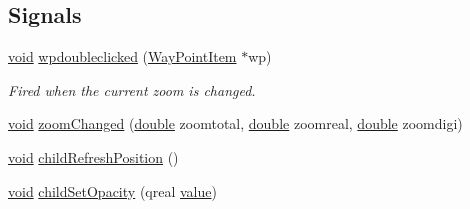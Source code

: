 \subsection*{Signals}
\begin{DoxyCompactItemize}
\item 
\hyperlink{group___u_a_v_objects_plugin_ga444cf2ff3f0ecbe028adce838d373f5c}{void} \hyperlink{group___o_p_map_widget_ga795f053b52b5fe955eee059db5cb0afd}{wpdoubleclicked} (\hyperlink{classmapcontrol_1_1_way_point_item}{Way\-Point\-Item} $\ast$wp)
\begin{DoxyCompactList}\small\item\em Fired when the current zoom is changed. \end{DoxyCompactList}\item 
\hyperlink{group___u_a_v_objects_plugin_ga444cf2ff3f0ecbe028adce838d373f5c}{void} \hyperlink{group___o_p_map_widget_ga7022afbf8533ece279e5b06dcbe66935}{zoom\-Changed} (\hyperlink{_super_l_u_support_8h_a8956b2b9f49bf918deed98379d159ca7}{double} zoomtotal, \hyperlink{_super_l_u_support_8h_a8956b2b9f49bf918deed98379d159ca7}{double} zoomreal, \hyperlink{_super_l_u_support_8h_a8956b2b9f49bf918deed98379d159ca7}{double} zoomdigi)
\item 
\hyperlink{group___u_a_v_objects_plugin_ga444cf2ff3f0ecbe028adce838d373f5c}{void} \hyperlink{group___o_p_map_widget_ga4877137ff20f1713d86737fcde3e5eef}{child\-Refresh\-Position} ()
\item 
\hyperlink{group___u_a_v_objects_plugin_ga444cf2ff3f0ecbe028adce838d373f5c}{void} \hyperlink{group___o_p_map_widget_ga2e3c45d4bbf9d439e3e6bb83d138c340}{child\-Set\-Opacity} (qreal \hyperlink{glext_8h_aa0e2e9cea7f208d28acda0480144beb0}{value})
\end{DoxyCompactItemize}
